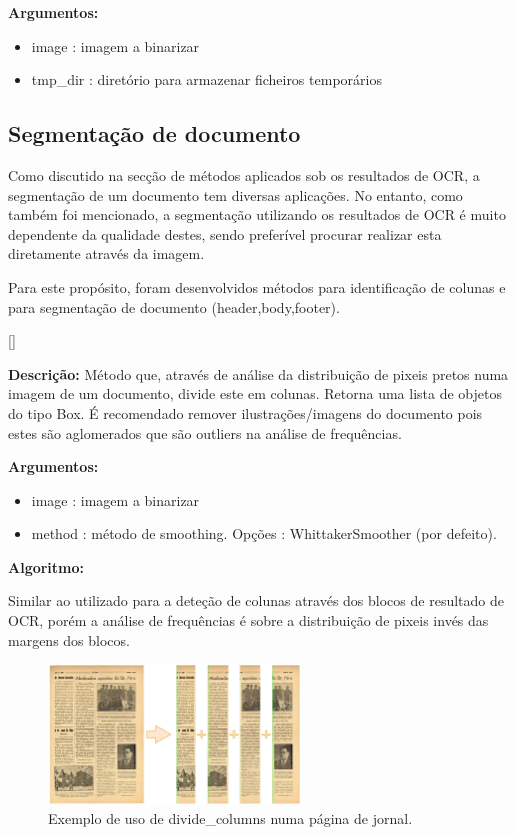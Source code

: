 \textbf{Argumentos:}
\begin{itemize}\setlength\itemsep{-0.3em}
	\vspace{-0.5em}
	\item image : imagem a binarizar
	\item tmp\_dir : diretório para armazenar ficheiros temporários
\end{itemize}


\subsection{Segmentação de documento}
\label{contribution_image_segmentation}

Como discutido na secção de métodos aplicados sob os resultados de OCR, a segmentação de um documento tem diversas aplicações. No entanto, como também foi mencionado, a segmentação utilizando os resultados de OCR é muito dependente da qualidade destes, sendo preferível procurar realizar esta diretamente através da imagem.

Para este propósito, foram desenvolvidos métodos para identificação de colunas e para segmentação de documento (header,body,footer).

[\normalsize]

\textbf{Descrição:} Método que, através de análise da distribuição de pixeis pretos numa imagem de um documento, divide este em colunas. Retorna uma lista de objetos do tipo Box.
É recomendado remover ilustrações/imagens do documento pois estes são aglomerados que são outliers na análise de frequências.

\textbf{Argumentos:}
\begin{itemize}\setlength\itemsep{-0.3em}
	\vspace{-0.5em}
	\item image : imagem a binarizar
	\item method : método de smoothing. Opções : WhittakerSmoother (por defeito).
\end{itemize}

\textbf{Algoritmo:} 

Similar ao utilizado para a deteção de colunas através dos blocos de resultado de OCR, porém a análise de frequências é sobre a distribuição de pixeis invés das margens dos blocos.


\begin{figure}[H]
	\centering
	\includegraphics[width=0.6\textwidth]{images/ilustracoes/divide_columns_example.png}
	\caption{Exemplo de uso de divide\_columns numa página de jornal.}
	\label{fig:divide_columns_example}
\end{figure}


